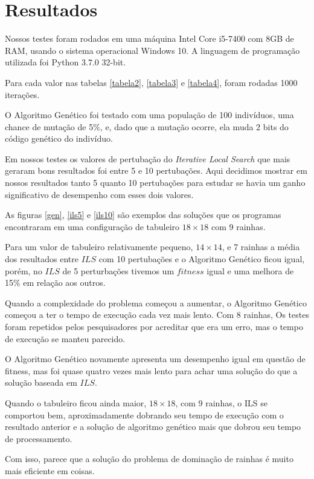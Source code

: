 \documentclass[
	article,			%
	11pt,				%
	oneside,			%
	a4paper,			%
	english,			%
	brazil,				%
	sumario=tradicional
	]{abntex2}
\begin{document}
\section{Resultados}

Nossos testes foram rodados em uma máquina Intel Core i5-7400 com 8GB de RAM, usando o sistema operacional Windows 10. A linguagem de programação utilizada foi Python 3.7.0 32-bit.

Para cada valor nas tabelas \ref{tabela2}, \ref{tabela3} e \ref{tabela4}, foram rodadas 1000 iterações.

O Algoritmo Genético foi testado com uma população de 100 indivíduos, uma chance de mutação de 5\%, e, dado que a mutação ocorre, ela muda 2 bits do código genético do indivíduo.

Em nossos testes os valores de pertubação do \textit{Iterative Local Search} que mais geraram bons resultados foi entre 5 e 10 pertubações. Aqui decidimos mostrar em nossos resultados tanto 5 quanto 10 pertubações para estudar se havia um ganho significativo de desempenho com esses dois valores.

As figuras \ref{gen}, \ref{ils5} e \ref{ils10} são exemplos das soluções que os programas encontraram em uma configuração de tabuleiro $18 \times 18$ com 9 rainhas.

Para um valor de tabuleiro relativamente pequeno, $14 \times 14$, e 7 rainhas a média dos resultados entre $ILS$ com 10 pertubações e o Algoritmo Genético ficou igual, porém, no $ILS$ de 5 perturbações tivemos um $fitness$ igual e uma melhora de 15\% em relação aos outros. 

Quando a complexidade do problema começou a aumentar, o Algoritmo Genético começou a ter o tempo de execução cada vez mais lento. Com 8 rainhas, Os testes foram repetidos pelos pesquisadores por acreditar que era um erro, mas o tempo de execução se manteu parecido.

O Algoritmo Genético novamente apresenta um desempenho igual em questão de fitness, mas foi quase quatro vezes mais lento para achar uma solução do que a solução baseada em $ILS$.

Quando o tabuleiro ficou ainda maior, $18 \times 18$, com 9 rainhas, o ILS se comportou bem, aproximadamente dobrando seu tempo de execução com o resultado anterior e a solução de algoritmo genético mais que dobrou seu tempo de processamento.

Com isso, parece que a solução do problema de dominação de rainhas é muito mais eficiente em coisas. 
\end{document}
